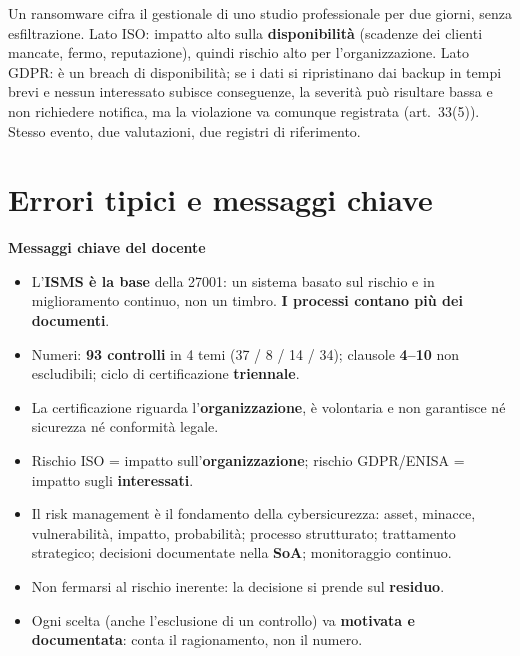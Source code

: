 \begin{integrazione}
Un ransomware cifra il gestionale di uno studio professionale per due giorni, senza esfiltrazione. Lato
ISO: impatto alto sulla \textbf{disponibilità} (scadenze dei clienti mancate, fermo, reputazione), quindi
rischio alto per l'organizzazione. Lato GDPR: è un breach di disponibilità; se i dati si ripristinano dai
backup in tempi brevi e nessun interessato subisce conseguenze, la severità può risultare bassa e non
richiedere notifica, ma la violazione va comunque registrata (art.~33(5)). Stesso evento, due valutazioni,
due registri di riferimento.
\end{integrazione}

\section{Errori tipici e messaggi chiave}
\label{sec:iso-errori}
\begin{esame}
\textbf{Messaggi chiave del docente}
\begin{itemize}
  \item L'\textbf{ISMS è la base} della 27001: un sistema basato sul rischio e in miglioramento continuo,
    non un timbro. \textbf{I processi contano più dei documenti}.
  \item Numeri: \textbf{93 controlli} in 4 temi (37 / 8 / 14 / 34); clausole \textbf{4--10} non escludibili;
    ciclo di certificazione \textbf{triennale}.
  \item La certificazione riguarda l'\textbf{organizzazione}, è volontaria e non garantisce né sicurezza né
    conformità legale.
  \item Rischio ISO = impatto sull'\textbf{organizzazione}; rischio GDPR/ENISA = impatto sugli
    \textbf{interessati}.
  \item Il risk management è il fondamento della cybersicurezza: asset, minacce, vulnerabilità, impatto,
    probabilità; processo strutturato; trattamento strategico; decisioni documentate nella \textbf{SoA};
    monitoraggio continuo.
  \item Non fermarsi al rischio inerente: la decisione si prende sul \textbf{residuo}.
  \item Ogni scelta (anche l'esclusione di un controllo) va \textbf{motivata e documentata}: conta il
    ragionamento, non il numero.
\end{itemize}
\end{esame}

